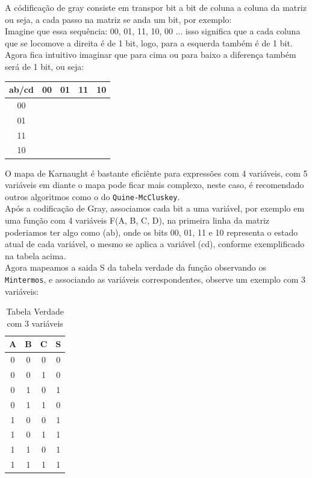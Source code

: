 \documentclass[12pt, onecolumn]{article}
\begin{document}
	A códificação de gray consiste em transpor bit a bit de coluna a coluna da 
	matriz ou seja, a cada passo na matriz se anda um bit, por exemplo: \\
	Imagine que essa sequência: 00, 01, 11, 10, 00 ... isso significa que a 
	cada coluna que se locomove a direita é de 1 bit, logo, para a esquerda 
	também é de 1 bit. \\
	\newline
	Agora fica intuitivo imaginar que para cima ou para baixo a diferença
	também será de 1 bit, ou seja: \\
	\begin{table}[h]
		\centering
		\begin{tabular}{|c|c|c|c|c|}
			\hline
			ab/cd & 00 & 01 & 11 & 10 \\ \hline
			00  &   &   &  & \\ \hline
			01  &   &   &  & \\ \hline
			11  &   &   &  & \\ \hline
			10  &   &   &  & \\ \hline
		\end{tabular}
	\end{table}
	O mapa de Karnaught é bastante eficiênte para expressões com 4 variáveis, 
	com 5 variáveis em diante o mapa pode ficar mais complexo, neste caso, é 
	recomendado outros algoritmos como o do \texttt{Quine-McCluskey}. \\ 
	\newline
	Após a codificação de Gray, associamos cada bit a uma variável, por exemplo
	em uma função com 4 variáveis F(A, B, C, D), na primeira linha da matriz
	poderiamos ter algo como (ab), onde os bits 00, 01, 11 e 10 representa o 
	estado atual de cada variável, o mesmo se aplica a variável (cd), conforme
	exemplificado na tabela acima. \\
	\newline
	Agora mapeamos a saida S da tabela verdade da função observando os 
	\texttt{Mintermos}, e associando as variáveis correspondentes, observe
	um exemplo com 3 variáveis: \\
	\begin{table}[h]
		\centering
		\begin{tabular}{|c|c|c|c|}
			\hline
			A & B & C & S \\ \hline
			0 & 0 & 0 & 0 \\ \hline
			0 & 0 & 1 & 0 \\ \hline
			0 & 1 & 0 & 1 \\ \hline
			0 & 1 & 1 & 0 \\ \hline
			1 & 0 & 0 & 1 \\ \hline
			1 & 0 & 1 & 1 \\ \hline
			1 & 1 & 0 & 1 \\ \hline
			1 & 1 & 1 & 1 \\ \hline 
		\end{tabular}
		\caption{Tabela Verdade com 3 variáveis}
	\end{table}
\end{document}
